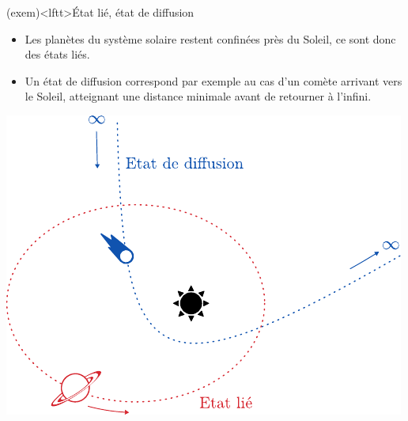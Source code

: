\documentclass[../../main/main.tex]{subfiles}
\begin{document}
\begin{tcb*}[sidebyside, righthand ratio=.4](exem)<lftt>{État lié, état de diffusion}
  \begin{itemize}
    \item Les planètes du système solaire restent confinées près du Soleil, ce
      sont donc des états liés.
    \item Un état de diffusion correspond par exemple au cas d'un comète
      arrivant vers le Soleil, atteignant une distance minimale avant de
      retourner à l'infini.
  \end{itemize}
  \tcblower
	\begin{center}
		\includegraphics[width=\linewidth]{ep_eff-att_liediff}
	\end{center}
\end{tcb*}

\vspace{-15pt}
\end{document}
